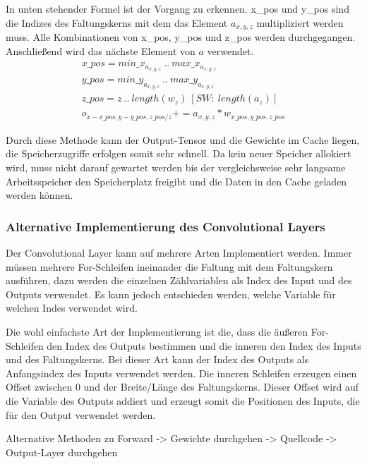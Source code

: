 \documentclass[../main.tex]{subfiles}
\begin{document}
In unten stehender Formel ist der Vorgang zu erkennen. x\_pos und y\_pos sind die Indizes des Faltungskerns mit dem das Element \(a_{x,y,z}\) multipliziert werden muss. Alle Kombinationen von x\_pos, y\_pos und z\_pos werden durchgegangen. Anschließend wird das nächste Element von \(a\) verwendet.
\begin{equation}
\begin{split}
x\_pos = {min\_x_{a_{x,y,z}}\ ..\ max\_x_{a_{x,y,z}}}\\
y\_pos = {min\_y_{a_{x,y,z}}\ ..\ max\_y_{a_{x,y,z}}}\\
z\_pos = {z\ ..\ length(w_{z})\ [SW:\ length(a_{z})]}\\
o_{x-x\_pos,y-y\_pos,z\_pos/z} += a_{x,y,z}*w_{x\_pos,y\_pos,z\_pos}
\end{split}
\end{equation}

Durch diese Methode kann der Output-Tensor und die Gewichte im Cache liegen, die Speicherzugriffe erfolgen somit sehr schnell. Da kein neuer Speicher allokiert wird, muss nicht darauf gewartet werden bis der vergleichsweise sehr langsame Arbeitsspeicher den Speicherplatz freigibt und die Daten in den Cache geladen werden können. 

\subsubsection{Alternative Implementierung des Convolutional Layers}

Der Convolutional Layer kann auf mehrere Arten Implementiert werden. Immer müssen mehrere For-Schleifen ineinander die Faltung mit dem Faltungskern ausführen, dazu werden die einzelnen Zählvariablen als Index des Input und des Outputs verwendet. Es kann jedoch entschieden werden, welche Variable für welchen Indes verwendet wird.

Die wohl einfachste Art der Implementierung ist die, dass die äußeren For-Schleifen den Index des Outputs bestimmen und die inneren den Index des Inputs und des Faltungskerns. Bei dieser Art kann der Index des Outputs als Anfangsindex des Inputs verwendet werden. Die inneren Schleifen erzeugen einen Offset zwischen 0 und der Breite/Länge des Faltungskerns. Dieser Offset wird auf die Variable des Outputs addiert und erzeugt somit die Positionen des Inputs, die für den Output verwendet werden.


Alternative Methoden zu Forward
-> Gewichte durchgehen
-> Quellcode
-> Output-Layer durchgehen
\end{document}

